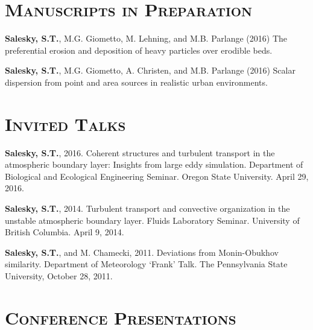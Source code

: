 \documentclass[11pt,letterpaper]{article}
\begin{document}

\section*{\textsc{Manuscripts in Preparation}} 

\textbf{Salesky, S.T.}, M.G. Giometto, M. Lehning, and M.B. Parlange (2016)
The preferential erosion and deposition of heavy particles over erodible beds.

\textbf{Salesky, S.T.}, M.G. Giometto, A. Christen, and M.B. Parlange (2016)
Scalar dispersion from point and area sources in realistic urban environments.


\section*{\textsc{Invited Talks}} 

\textbf{Salesky, S.T.}, 2016. Coherent structures and turbulent transport in the atmospheric boundary layer: Insights 
from large eddy simulation. Department of Biological and Ecological Engineering Seminar. Oregon State University. 
April 29, 2016.

\textbf{Salesky, S.T.}, 2014. Turbulent transport and convective organization in the unstable atmospheric boundary layer. Fluids Laboratory Seminar. University of British Columbia. April 9, 2014. 

\textbf{Salesky, S.T.}, and M. Chamecki, 2011. Deviations from Monin-Obukhov similarity. Department of Meteorology `Frank' Talk. The Pennsylvania State University, October 28, 2011. 

\section*{\textsc{Conference Presentations}} 
\end{document}
